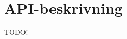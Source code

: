 \documentclass[swedish]{kththesis}
\begin{document}


\printbibliography[heading=bibintoc] %

\appendix

\chapter{API-beskrivning}
\label{appendix:api-beskrivning}
TODO!
\end{document}
